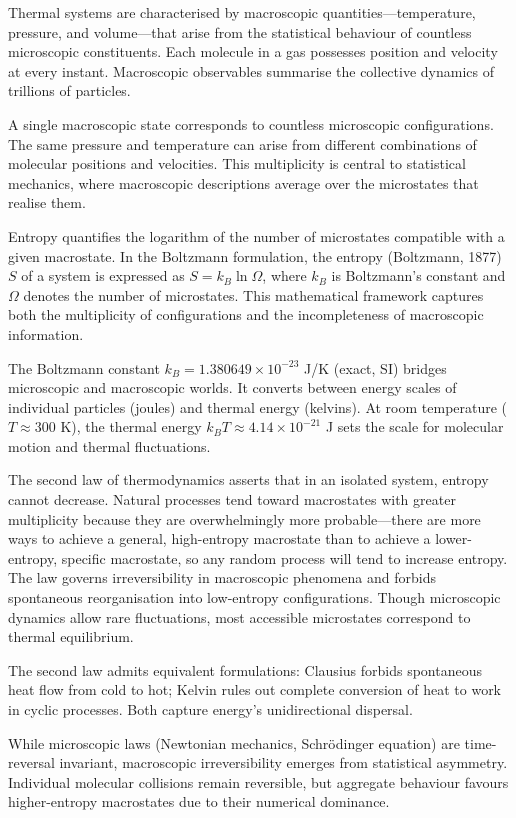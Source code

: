 Thermal systems are characterised by macroscopic quantities—temperature, pressure, and volume—that arise from the statistical behaviour of countless microscopic constituents. Each molecule in a gas possesses position and velocity at every instant. Macroscopic observables summarise the collective dynamics of trillions of particles.

A single macroscopic state corresponds to countless microscopic configurations. The same pressure and temperature can arise from different combinations of molecular positions and velocities. This multiplicity is central to statistical mechanics, where macroscopic descriptions average over the microstates that realise them.

Entropy quantifies the logarithm of the number of microstates compatible with a given macrostate. In the Boltzmann formulation, the entropy (Boltzmann, 1877) $S$ of a system is expressed as $S = k_B \ln \Omega$, where $k_B$ is Boltzmann's constant and $\Omega$ denotes the number of microstates. This mathematical framework captures both the multiplicity of configurations and the incompleteness of macroscopic information.

The Boltzmann constant $k_B = 1.380649 \times 10^{-23}$ J/K (exact, SI) bridges microscopic and macroscopic worlds. It converts between energy scales of individual particles (joules) and thermal energy (kelvins). At room temperature ($T \approx 300$ K), the thermal energy $k_B T \approx 4.14 \times 10^{-21}$ J sets the scale for molecular motion and thermal fluctuations.

The second law of thermodynamics asserts that in an isolated system, entropy cannot decrease. Natural processes tend toward macrostates with greater multiplicity because they are overwhelmingly more probable—there are more ways to achieve a general, high-entropy macrostate than to achieve a lower-entropy, specific macrostate, so any \QSOpen{}random\QSClose{} process will tend to increase entropy. The law governs irreversibility in macroscopic phenomena and forbids spontaneous reorganisation into low-entropy configurations. Though microscopic dynamics allow rare fluctuations, most accessible microstates correspond to thermal equilibrium.

The second law admits equivalent formulations: Clausius forbids spontaneous heat flow from cold to hot; Kelvin rules out complete conversion of heat to work in cyclic processes. Both capture energy's unidirectional dispersal.

While microscopic laws (Newtonian mechanics, Schrödinger equation) are time-reversal invariant, macroscopic irreversibility emerges from statistical asymmetry. Individual molecular collisions remain reversible, but aggregate behaviour favours higher-entropy macrostates due to their numerical dominance.

